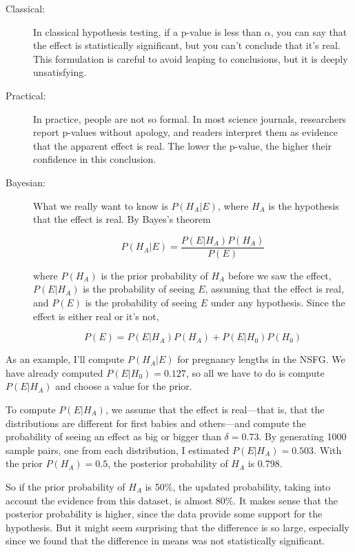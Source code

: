 \documentclass[12pt]{book}
\begin{document}
\begin{description}

\item[Classical:] In classical hypothesis testing, if a p-value
  is less than $\alpha$, you can say that the effect is statistically
  significant, but you can't conclude that it's real.  This
  formulation is careful to avoid leaping to conclusions, but it is
  deeply unsatisfying.

\item[Practical:] In practice, people are not so formal.  In most
  science journals, researchers report p-values without apology, and
  readers interpret them as evidence that the apparent effect is real.
  The lower the p-value, the higher their confidence in this
  conclusion.

\item[Bayesian:] What we really want to know is $P(H_A | E)$, where
  $H_A$ is the hypothesis that the effect is real.  By Bayes's theorem

  \[ P(H_A | E) = \frac{P(E | H_A) P(H_A)}{P(E)} \]
  
  where $P(H_A)$ is the prior probability of $H_A$ before we saw the
  effect, $P(E | H_A)$ is the probability of seeing $E$, assuming that
  the effect is real, and $P(E)$ is the probability of seeing $E$
  under any hypothesis.  Since the effect is either real or it's not,

  \[ P(E) = P(E | H_A) P(H_A) + P(E | H_0) P(H_0) \]

\end{description}

As an example, I'll compute $P(H_A | E)$ for pregnancy lengths in the
NSFG.  We have already computed $P(E | H_0)=0.127$, so all we have to
do is compute $P(E | H_A)$ and choose a value for the prior.

To compute $P(E | H_A)$, we assume that the effect is real---that is,
that the distributions are different for first babies and others---and
compute the probability of seeing an effect as big or bigger than
$\delta = 0.73$.  By generating 1000 sample pairs, one from each
distribution, I estimated $P(E | H_A) = 0.503$.  With the prior
$P(H_A)=0.5$, the posterior probability of $H_A$ is 0.798.


So if the prior probability of $H_A$ is 50\%, the updated
probability, taking into account the evidence from this dataset,
is almost 80\%.  It makes sense that the posterior probability
is higher, since the data provide some support for the hypothesis.
But it might seem surprising that the difference is so large,
especially since we found that the difference in means was not
statistically significant.
\end{document}
